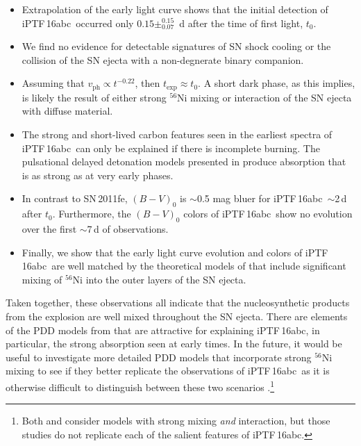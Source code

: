 \documentclass[twocolumn]{aastex61}
\newcommand{\abc}{iPTF\,16abc}
\begin{document}
\begin{itemize}
    \item Extrapolation of the early light curve shows that the initial detection of \abc\ occurred only $0.15\pm_{0.07}^{0.15}$~d after the time of first light, $t_0$.

    \item We find no evidence for detectable signatures of SN shock cooling or the collision of the SN ejecta with a non-degnerate binary companion.

    \item Assuming that $v_\mathrm{ph} \propto t^{-0.22}$, then $t_\mathrm{exp} \approx t_0$. A short dark phase, as this implies, is likely the result of either strong $^{56}$Ni mixing or interaction of the SN ejecta with diffuse material.

    \item The strong and short-lived carbon features seen in the 
earliest spectra of \abc\ can only be explained if there is incomplete burning. The pulsational delayed detonation models presented in \citet{2014MNRAS.441..532D} produce  absorption that is as strong as  at very early phases.

    \item In contrast to SN\,2011fe, $(B - V)_0$ is $\sim$0.5 mag bluer for \abc\ $\sim$2\,d after $t_0$. Furthermore, the $(B - V)_0$ colors of \abc\ show no evolution over the first $\sim$7\,d  of observations.

    \item Finally, we show that the early light curve evolution and colors of \abc\ are well matched by the theoretical models of \citet{2016ApJ...826...96P} that include significant mixing of $^{56}$Ni into the outer layers of the SN ejecta. 
 
\end{itemize}
%
Taken together, these observations all indicate that the nucleosynthetic products from the explosion are well mixed throughout the SN ejecta. There are elements of the PDD models from \citet{2014MNRAS.441..532D} that are attractive for explaining \abc, in particular, the strong  absorption seen at early times. In the future, it would be useful to investigate more detailed PDD models that incorporate strong $^{56}$Ni mixing to see if they better replicate the observations of \abc\ as it is otherwise difficult to distinguish between these two scenarios \citep{2017MNRAS.472.2787N}.\footnote{Both \citet{2014MNRAS.441..532D} and \citet{2016ApJ...826...96P} consider models with strong mixing \textit{and} interaction, but those studies do not replicate each of the salient features of \abc.}  
\end{document}
